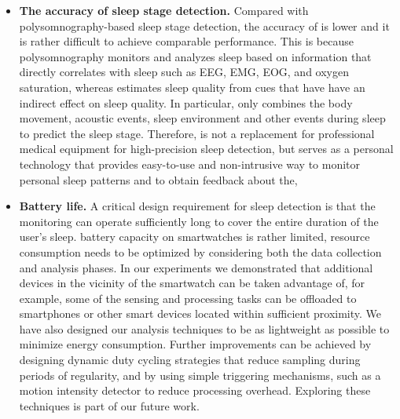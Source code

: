 \begin{itemize}
  \item \textbf{The accuracy of sleep stage detection.}
  Compared with polysomnography-based sleep stage detection, the accuracy of {\systemname} is lower and it is rather difficult to achieve comparable performance. This is because polysomnography monitors and analyzes sleep based on information that directly correlates with sleep such as EEG, EMG, EOG, and oxygen saturation, whereas {\systemname} estimates sleep quality from cues that have have an indirect effect on sleep quality. In particular, \systemname only combines the body movement, acoustic events, sleep environment and other events during sleep to predict the sleep stage. Therefore, {\systemname} is not a replacement for professional medical equipment for high-precision sleep detection, but serves as a personal technology that provides easy-to-use and non-intrusive way to monitor personal sleep patterns and to obtain feedback about the, %
  \item \textbf{Battery life.} 
  A critical design requirement for sleep detection is that the monitoring can operate sufficiently long to cover the entire duration of the user's sleep. battery capacity on smartwatches is rather limited, resource consumption needs to be optimized by considering both the data collection and analysis phases. In our experiments we demonstrated that additional devices in the vicinity of the smartwatch can be taken advantage of, for example, some of the sensing and processing tasks can be offloaded to smartphones or other smart devices located within sufficient proximity. We have also designed our analysis techniques to be as lightweight as possible to minimize energy consumption. Further improvements can be achieved by designing dynamic duty cycling strategies that reduce sampling during periods of regularity, and by using simple triggering mechanisms, such as a motion intensity detector to reduce processing overhead. Exploring these techniques is part of our future work.%

\end{itemize}

